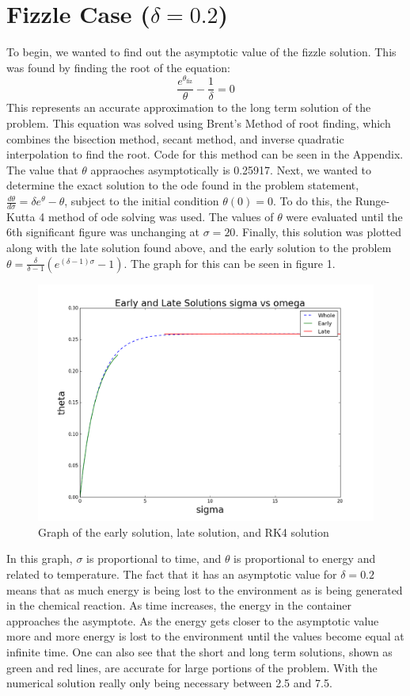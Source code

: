 \documentclass{article}
\begin{document}
\section*{Fizzle Case ($\delta=0.2$)}
To begin, we wanted to find out the asymptotic value of the fizzle solution. This was found by finding the root of the equation:
\[\frac{e^{\theta_{\text{fiz}}}}{\theta}-\frac{1}{\delta}=0\]
This represents an accurate approximation to the long term solution of the problem. This equation was solved using Brent's Method of root finding, which combines the bisection method, secant method, and inverse quadratic interpolation to find the root. Code for this method can be seen in the Appendix. The value that $\theta$ appraoches asymptotically is 0.25917. Next, we wanted to determine the exact solution to the ode found in the problem statement, $\frac{d\theta}{d\sigma}=\delta
e^{\theta}-\theta$, subject to the initial condition $\theta(0)=0$. To do this, the Runge-Kutta 4 method of ode solving was used. The values of $\theta$ were evaluated until the 6th significant figure was unchanging at $\sigma=20$. Finally, this solution was plotted along with the late solution found above, and the early solution to the problem $\theta=\frac{\delta}{\delta-1}\left (e^{(\delta-1)\sigma}-1\right )$. The graph for this can be seen in figure 1.\\
\begin{figure}[H]
    \centering
    \includegraphics[width=\textwidth]{part1.png}
    \caption{Graph of the early solution, late solution, and RK4 solution}
\end{figure}
In this graph, $\sigma$ is proportional to time, and $\theta$ is proportional to energy and related to temperature. The fact that it has an asymptotic value for $\delta=0.2$ means that as much energy is being lost to the environment as is being generated in the chemical reaction. As time increases, the energy in the container approaches the asymptote. As the energy gets closer to the asymptotic value more and more energy is lost to the environment until the values become equal at
infinite time. One can also see that the short and long term solutions, shown as green and red lines, are accurate for large portions of the problem. With the numerical solution really only being necessary between 2.5 and 7.5.
\end{document}
